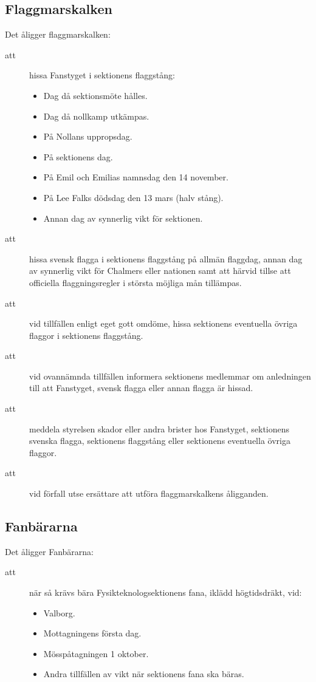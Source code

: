 \subsection{Flaggmarskalken}
Det åligger flaggmarskalken:
    \begin{description}
      \item[att] hissa Fanstyget i sektionens flaggstång:
	\begin{itemize}
	  \item Dag då sektionsmöte hålles.
	  \item Dag då nollkamp utkämpas.
	  \item På Nollans uppropsdag.
	  \item På sektionens dag.
	  \item På Emil och Emilias namnsdag den 14 november.
	  \item På Lee Falks dödsdag den 13 mars (halv stång).
	  \item Annan dag av synnerlig vikt för sektionen.
	\end{itemize}
      \item[att] hissa svensk flagga i sektionens flaggstång på allmän
      flaggdag, annan dag av synnerlig vikt för Chalmers eller
      nationen samt att härvid tillse att officiella flaggningsregler
      i största möjliga mån tillämpas.
      \item[att] vid tillfällen enligt eget gott omdöme, hissa
      sektionens eventuella övriga flaggor i sektionens flaggstång.
      \item[att] vid ovannämnda tillfällen informera sektionens
      medlemmar om anledningen till att Fanstyget, svensk flagga eller
      annan flagga är hissad.
      \item[att] meddela styrelsen skador eller andra brister hos
      Fanstyget, sektionens svenska flagga, sektionens flaggstång
      eller sektionens eventuella övriga flaggor.
      \item[att] vid förfall utse ersättare att utföra flaggmarskalkens åligganden.
    \end{description}

\subsection{Fanbärarna}
Det åligger Fanbärarna:
    \begin{description}
      \item[att] när så krävs bära Fysikteknologsektionens fana, iklädd
      högtidsdräkt, vid:
        \begin{itemize}
	  \item Valborg.
	  \item Mottagningens första dag.
	  \item Mösspåtagningen 1 oktober.
	  \item Andra tillfällen av vikt när sektionens fana ska bäras.
	\end{itemize}
    \end{description}




